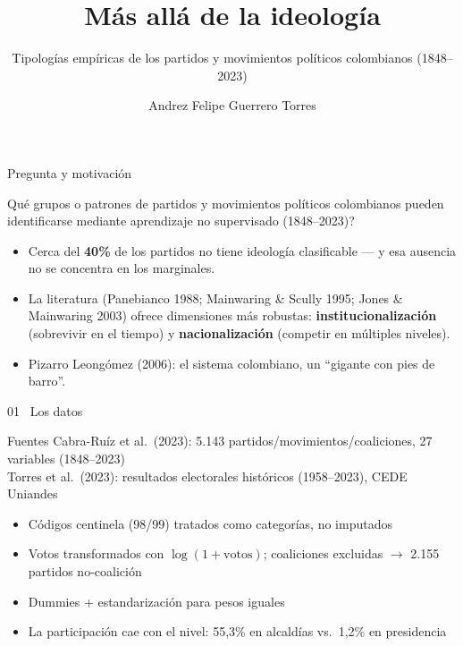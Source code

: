 \documentclass[11pt,aspectratio=169]{beamer}
\title{\textbf{Más allá de la ideología}}
\subtitle{Tipologías empíricas de los partidos y movimientos políticos colombianos (1848--2023)}
\author{Andrez Felipe Guerrero Torres}
\institute{Aprendizaje de Máquinas y Políticas Públicas \\ Bogotá Summer School in Economics 2026 --- Pontificia Universidad Javeriana}
\date{}
\begin{document}
\begin{frame}[plain]
\titlepage
\end{frame}

\begin{frame}{Pregunta y motivación}
\begin{center}
\large\color{teal}\textquestiondown{}Qué grupos o patrones de partidos y movimientos políticos colombianos pueden identificarse mediante aprendizaje no supervisado (1848--2023)?
\end{center}
\vspace{0.4cm}
\begin{itemize}
  \item Cerca del \textbf{40\%} de los partidos no tiene ideología clasificable --- y esa ausencia no se concentra en los marginales.
  \item La literatura (Panebianco 1988; Mainwaring \& Scully 1995; Jones \& Mainwaring 2003) ofrece dimensiones más robustas: \textbf{institucionalización} (sobrevivir en el tiempo) y \textbf{nacionalización} (competir en múltiples niveles).
  \item Pizarro Leongómez (2006): el sistema colombiano, un ``gigante con pies de barro''.
\end{itemize}
\end{frame}

\begin{frame}{01 \textbullet\ Los datos}
\begin{block}{Fuentes}
Cabra-Ruíz et al.\ (2023): 5.143 partidos/movimientos/coaliciones, 27 variables (1848--2023) \\
Torres et al.\ (2023): resultados electorales históricos (1958--2023), CEDE Uniandes
\end{block}
\begin{itemize}
  \item Códigos centinela (98/99) tratados como categorías, no imputados
  \item Votos transformados con $\log(1+\text{votos})$; coaliciones excluidas $\rightarrow$ 2.155 partidos no-coalición
  \item Dummies + estandarización para pesos iguales
  \item La participación cae con el nivel: 55,3\% en alcaldías vs.\ 1,2\% en presidencia
\end{itemize}
\end{frame}
\end{document}
